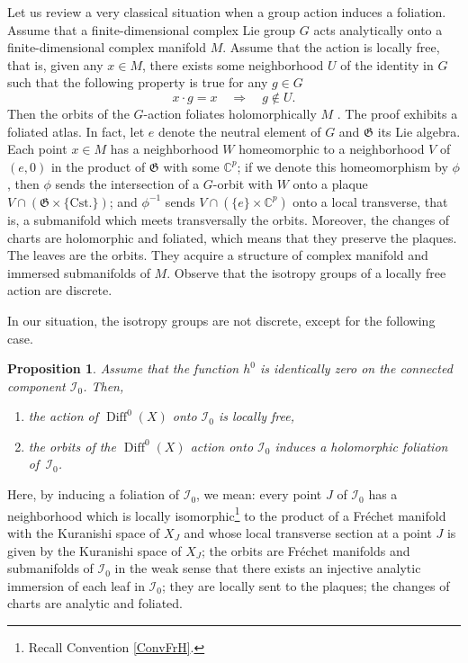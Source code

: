 \documentclass[10pt]{amsart}
\let\mathcal\mathscr
\DeclareMathOperator{\Diff}{Diff}
\theoremstyle{plain}
\newtheorem{proposition}[theorem]{Proposition}
\theoremstyle{definition}
\theoremstyle{remark}
\numberwithin{equation}{section}
\newcommand{\CC}{{\mathbb{C}}}
\newcommand{\cI}{\mathcal{I}}
\begin{document}
Let us review a very classical situation when a group action induces a foliation. Assume that a finite-dimensional complex Lie group $G$ acts analytically onto a finite-dimensional complex manifold $M$. Assume that the action is locally free, that is, given any $x\in M$, there exists some neighborhood $U$ of the identity in $G$ such that the following property is true for any $g\in G$\vspace*{-2pt}
\begin{equation*}
x\cdot g=x\quad\Longrightarrow \quad g\not\in U.
\end{equation*}
Then the orbits of the $G$-action foliates holomorphically $M$ \cite[\S 2.1]{CLN}. The proof exhibits a foliated atlas. In fact, let $e$ denote the neutral element of $G$ and $\mathfrak G$ its Lie algebra. Each point $x\in M$ has a neighborhood $W$ homeomorphic to a neighborhood $V$ of $(e,0)$ in the product of $\mathfrak G$ with some $\CC^p$; if we denote this homeomorphism by $\phi$, then $\phi$ sends the intersection of a $G$-orbit with $W$ onto a plaque $V\cap (\mathfrak G\times\{\text{Cst.}\})$; and $\phi^{-1}$ sends $V\cap (\{e\}\times\CC^p)$ onto a local transverse, that is, a submanifold which meets transversally the orbits. Moreover, the changes of charts are holomorphic and foliated, which means that they preserve the plaques. The leaves are the orbits. They acquire a structure of complex manifold and immersed submanifolds of $M$. Observe that the isotropy groups of a locally free action are discrete.

In our situation, the isotropy groups are not discrete, except for the following case.

\begin{proposition}
\label{foliationsimple}
Assume that the function $h^0$ is identically zero on the connected component $\cI_0$. Then,
\begin{enumerate}
\item\label{foliationsimple1}
the action of $\Diff^0(X)$ onto $\cI_0$ is locally free,
\item\label{foliationsimple2}
the orbits of the $\Diff^0(X)$ action onto $\cI_0$ induces a holomorphic foliation of~$\cI_0$.
\end{enumerate}
\end{proposition}

Here, by inducing a foliation of $\cI_0$, we mean: every point $J$ of $\cI_0$ has a neighborhood which is locally isomorphic\footnote{Recall Convention \ref{ConvFrH}.} to the product of a Fréchet manifold with the Kuranishi space of $X_J$ and whose local transverse section at a point $J$ is given by the Kuranishi space of $X_J$; the orbits are Fréchet manifolds and submanifolds of $\cI_0$ in the weak sense that there exists an injective analytic immersion of each leaf in $\cI_0$; they are locally sent to the plaques; the changes of charts are analytic and foliated.
\end{document}
